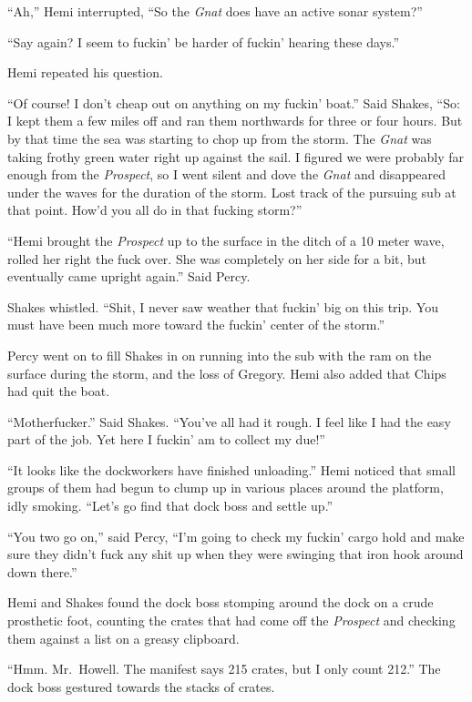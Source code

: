 \documentclass[
]{scrbook}
\begin{document}
``Ah,'' Hemi interrupted, ``So the \emph{Gnat} does have an active sonar
system?''

``Say again? I seem to fuckin' be harder of fuckin' hearing these
days.''

Hemi repeated his question.

``Of course! I don't cheap out on anything on my fuckin' boat.'' Said
Shakes, ``So: I kept them a few miles off and ran them northwards for
three or four hours. But by that time the sea was starting to chop up
from the storm. The \emph{Gnat} was taking frothy green water right up
against the sail. I figured we were probably far enough from the
\emph{Prospect}, so I went silent and dove the \emph{Gnat} and
disappeared under the waves for the duration of the storm. Lost track of
the pursuing sub at that point. How'd you all do in that fucking
storm?''

``Hemi brought the \emph{Prospect} up to the surface in the ditch of a
10 meter wave, rolled her right the fuck over. She was completely on her
side for a bit, but eventually came upright again.'' Said Percy.

Shakes whistled. ``Shit, I never saw weather that fuckin' big on this
trip. You must have been much more toward the fuckin' center of the
storm.''

Percy went on to fill Shakes in on running into the sub with the ram on
the surface during the storm, and the loss of Gregory. Hemi also added
that Chips had quit the boat.

``Motherfucker.'' Said Shakes. ``You've all had it rough. I feel like I
had the easy part of the job. Yet here I fuckin' am to collect my due!''

``It looks like the dockworkers have finished unloading.'' Hemi noticed
that small groups of them had begun to clump up in various places around
the platform, idly smoking. ``Let's go find that dock boss and settle
up.''

``You two go on,'' said Percy, ``I'm going to check my fuckin' cargo
hold and make sure they didn't fuck any shit up when they were swinging
that iron hook around down there.''

Hemi and Shakes found the dock boss stomping around the dock on a crude
prosthetic foot, counting the crates that had come off the
\emph{Prospect} and checking them against a list on a greasy clipboard.

``Hmm. Mr.~Howell. The manifest says 215 crates, but I only count 212.''
The dock boss gestured towards the stacks of crates.
\end{document}

